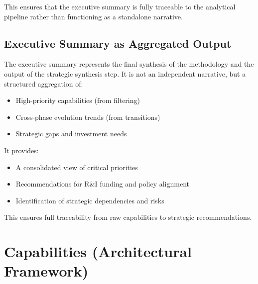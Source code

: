 \documentclass{ieeeaccess}
\begin{document}
This ensures that the executive summary is fully traceable to the analytical pipeline rather than functioning as a standalone narrative.
\subsection{Executive Summary as Aggregated Output}

The executive summary represents the final synthesis of the methodology and the output of the strategic synthesis step. It is not an independent narrative, but a structured aggregation of:

\begin{itemize}
    \item High-priority capabilities (from filtering)
    \item Cross-phase evolution trends (from transitions)
    \item Strategic gaps and investment needs
\end{itemize}

It provides:

\begin{itemize}
    \item A consolidated view of critical priorities
    \item Recommendations for R\&I funding and policy alignment
    \item Identification of strategic dependencies and risks
\end{itemize}

This ensures full traceability from raw capabilities to strategic recommendations.

\newpage


\section{Capabilities (Architectural Framework)}
\end{document}

